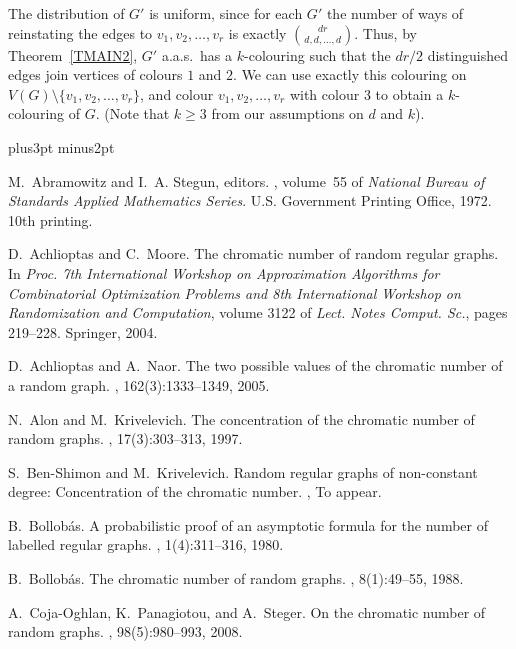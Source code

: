 \documentclass[12pt]{article}
\def\blackslug{\hbox{\kern1pt\vrule height6pt width4pt  depth1pt\kern1pt}}
\def\qed{\penalty 500\hbox{\quad\blackslug}\ifmmode\else\par
                                             \vskip4.5pt plus3pt minus2pt\fi}
\begin{document}
The distribution of $G'$ is uniform, since for each $G'$ the number of ways of reinstating the edges to $v_1,v_2,\ldots,v_r$ is exactly $\binom{dr}{d,d,\ldots,d}$.
Thus, by Theorem~\ref{TMAIN2}, $G'$ a.a.s.\ has a $k$-colouring such that the $dr/2$ distinguished edges join vertices of colours $1$ and $2$. We can use exactly this colouring on $V(G)\setminus\{v_1,v_2,\ldots,v_r\}$, and colour $v_1,v_2,\ldots,v_r$ with colour $3$ to obtain a $k$-colouring of $G$. (Note that $k\ge3$ from our assumptions on $d$ and $k$). \qed



\begin{thebibliography}{10}

M.~Abramowitz and I.~A. Stegun, editors.
, volume~55 of {\em National Bureau of
  Standards Applied Mathematics Series}.
\newblock U.S. Government Printing Office, 1972.
\newblock 10th printing.

D.~Achlioptas and C.~Moore.
\newblock The chromatic number of random regular graphs.
\newblock In {\em Proc. 7th International Workshop on Approximation Algorithms
  for Combinatorial Optimization Problems and 8th International Workshop on
  Randomization and Computation}, volume 3122 of {\em Lect. Notes Comput. Sc.},
  pages 219--228. Springer, 2004.

D.~Achlioptas and A.~Naor.
\newblock The two possible values of the chromatic number of a random graph.
, 162(3):1333--1349, 2005.

N.~Alon and M.~Krivelevich.
\newblock The concentration of the chromatic number of random graphs.
, 17(3):303--313, 1997.

S.~Ben-Shimon and M.~Krivelevich.
\newblock Random regular graphs of non-constant degree: Concentration of the
  chromatic number.
, To appear.

B.~Bollob{\' a}s.
\newblock A probabilistic proof of an asymptotic formula for the number of
  labelled regular graphs.
, 1(4):311--316, 1980.

B.~Bollob{\' a}s.
\newblock The chromatic number of random graphs.
, 8(1):49--55, 1988.

A.~Coja-Oghlan, K.~Panagiotou, and A.~Steger.
\newblock On the chromatic number of random graphs.
, 98(5):980--993, 2008.


\end{thebibliography}
\end{document}
